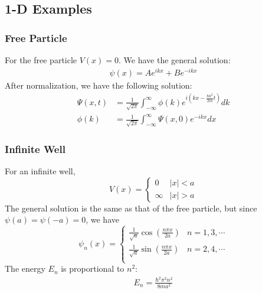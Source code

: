 \documentclass[a4paper]{article}
\begin{document}
\begin{multicols*}{2}
\subsection{1-D Examples}
\subsubsection{Free Particle}
For the free particle $V(x) = 0$. We have the general solution:
\begin{align*}
  \psi (x) = Ae^{ikx} + Be^{-ikx}
\end{align*}
After normalization, we have the following solution:
\begin{align*}
  \Psi (x,t) &= \frac{1}{\sqrt{2\pi}} \int_{-\infty}^\infty \phi(k)
  e^{i \left( kx-\frac{\hbar k^2}{2m}t \right)} dk \\
  \phi(k) &= \frac{1}{\sqrt{2\pi}} \int_{-\infty}^\infty \Psi(x, 0) e^{-ikx} dx
\end{align*}
\subsubsection{Infinite Well}
For an infinite well,
\[
  V(x) =
  \begin{cases}
    0 &  |x| < a \\
    \infty & |x| > a
  \end{cases}
\]
The general solution is the same as that of the free particle, but since
$\psi(a) = \psi(-a) = 0$, we have
\[
  \psi_n(x) =
  \begin{cases}
    \frac{1}{\sqrt{a}}\cos \left(\frac{n\pi x}{2a}\right) & n = 1,3,\cdots \\
    \frac{1}{\sqrt{a}}\sin \left(\frac{n\pi x}{2a}\right) & n = 2,4,\cdots \\
  \end{cases}
\]
The energy $E_n$ is proportional to $n^2$:
\begin{align*}
  E_n = \frac{\hbar^2 \pi^2 n^2}{8 m a^2}
\end{align*}


\end{multicols*}
\end{document}
